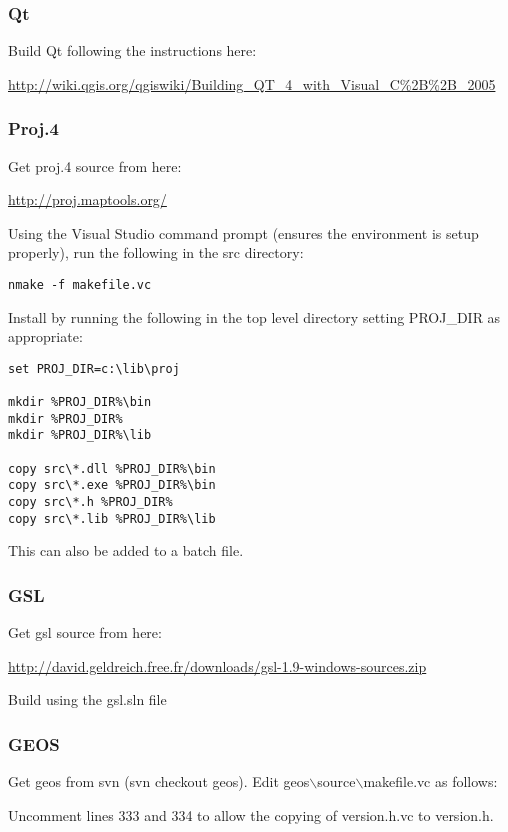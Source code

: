 \subsubsection{Qt}
Build Qt following the instructions here:

\url{http://wiki.qgis.org/qgiswiki/Building\_QT\_4\_with\_Visual\_C\%2B\%2B\_2005}

\subsubsection{Proj.4}
Get proj.4 source from here:

\url{http://proj.maptools.org/}

Using the Visual Studio command prompt (ensures the environment is setup properly), run the following in the src directory:

\begin{verbatim}
nmake -f makefile.vc
\end{verbatim}

Install by running the following in the top level directory setting PROJ\_DIR as appropriate:

\begin{verbatim}
set PROJ_DIR=c:\lib\proj

mkdir %PROJ_DIR%\bin
mkdir %PROJ_DIR%
mkdir %PROJ_DIR%\lib

copy src\*.dll %PROJ_DIR%\bin
copy src\*.exe %PROJ_DIR%\bin
copy src\*.h %PROJ_DIR%
copy src\*.lib %PROJ_DIR%\lib 
\end{verbatim}

This can also be added to a batch file.

\subsubsection{GSL}
Get gsl source from here:

\url{http://david.geldreich.free.fr/downloads/gsl-1.9-windows-sources.zip}

Build using the gsl.sln file

\subsubsection{GEOS}
Get geos from svn (svn checkout  geos).
Edit geos$\backslash$source$\backslash$makefile.vc as follows:

Uncomment lines 333 and 334 to allow the copying of version.h.vc to version.h.

